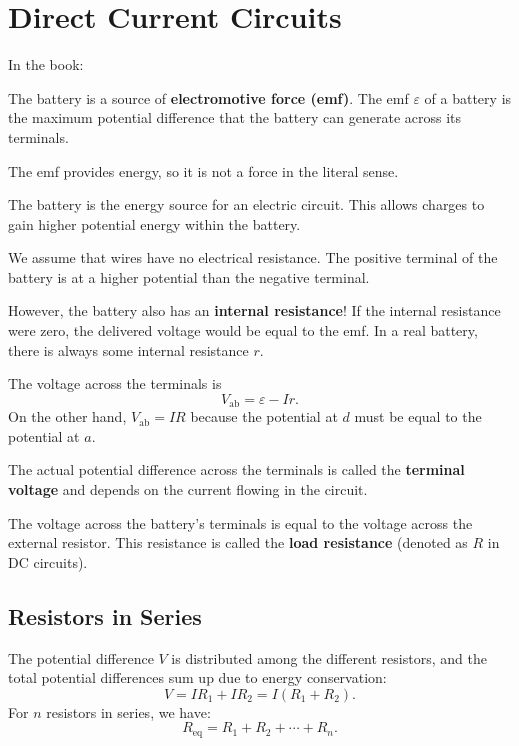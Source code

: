 \setcounter{chapter}{5}
\chapter{Direct Current Circuits}
In the book:~\cite[Ch. 26]{giancoli}


The battery is a source of \textbf{electromotive force (emf)}.
The emf $\varepsilon$ of a battery is the maximum potential difference that the battery can generate across its terminals.

\begin{remark}{}
    The emf provides energy, so it is not a force in the literal sense.
\end{remark}

The battery is the energy source for an electric circuit.
This allows charges to gain higher potential energy within the battery.

We assume that wires have no electrical resistance.
The positive terminal of the battery is at a higher potential than the negative terminal.

\begin{remark}{}
    However, the battery also has an \textbf{internal resistance}!
    If the internal resistance were zero, the delivered voltage would be equal to the emf.
    In a real battery, there is always some internal resistance $r$.
\end{remark}

The voltage across the terminals is
\[
    V_{\text{ab}} = \varepsilon - Ir.
\]
On the other hand, $V_{\text{ab}} = IR$ because the potential at $d$ must be equal to the potential at $a$.

The actual potential difference across the terminals is called the \textbf{terminal voltage} and depends on the current flowing in the circuit.

The voltage across the battery’s terminals is equal to the voltage across the external resistor.
This resistance is called the \textbf{load resistance} (denoted as $R$ in DC circuits).


\section{Resistors in Series}

The potential difference $V$ is distributed among the different resistors, and the total potential differences sum up due to energy conservation:
\[
    V = IR_1 + IR_2 = I(R_1 + R_2).
\]
For $n$ resistors in series, we have:
\[
    R_{\text{eq}} = R_1 + R_2 + \cdots + R_n.
\]


